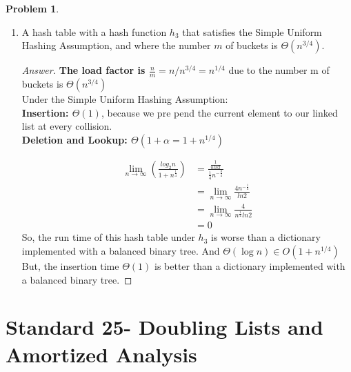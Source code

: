 \documentclass[11pt]{article}
\theoremstyle{definition}
\theoremstyle{definition}
\newtheorem{required}{Problem}
\theoremstyle{definition}
\begin{document}
\begin{required}
\begin{enumerate}[label=(\alph*)]
\begin{proof}[Answer]
\begin{align*}
\lim _{n\to \infty }\left(\frac{log_2n}{2}\right)&=\infty 
\end{align*}
So, the Deletion and Lookup run time of this hash table under  $h_2$ is better than a dictionary implemented with a balanced binary tree. And $\Theta(1) \in O(\log n)$\\
And, the insertion time is better than a dictionary implemented with a balanced binary tree.$\Theta(1) \in O(\log n)$\\
\end{proof}


\vskip 15pt	
\item A hash table with a hash function $h_3$ that satisfies the Simple Uniform Hashing Assumption, and where the number $m$ of buckets is $\Theta(n^{3/4})$.

\begin{proof}[Answer]
\textbf{The load factor is $\frac{n}{m} = n/n^{3/4} = n^{1/4}$} due to the number m of buckets is $\Theta(n^{3/4})$\\
Under the Simple Uniform Hashing Assumption:\\
\textbf{Insertion: $\Theta(1)$}, because we pre pend the current element to our linked list at every collision.\\
\textbf{Deletion and Lookup: $\Theta(1+\alpha = 1+n^{1/4})$}

\begin{align*}
\lim _{n\to \infty }\left(\frac{log_2n}{1+n^{\frac{1}{4}}}\right)&=\frac{\frac{1}{nln2}}{\frac{1}{4}n^{-\frac{3}{4}}}\\
&=\lim _{n\to \infty }\frac{4n^{-\frac{1}{4}}}{ln2}\\
&=\lim _{n\to \infty }\frac{4}{n^{\frac{1}{4}}ln2}\\
&= 0
\end{align*}
So, the run time of this hash table under  $h_3$ is worse than a dictionary implemented with a balanced binary tree. And $\Theta(\log n) \in O(1+n^{1/4})$\\
But, the insertion time  $\Theta(1)$ is better than a dictionary implemented with a balanced binary tree.
\end{proof}

\end{enumerate}
\end{required}



\newpage
\section{Standard 25- Doubling Lists and Amortized Analysis}
\end{document}
